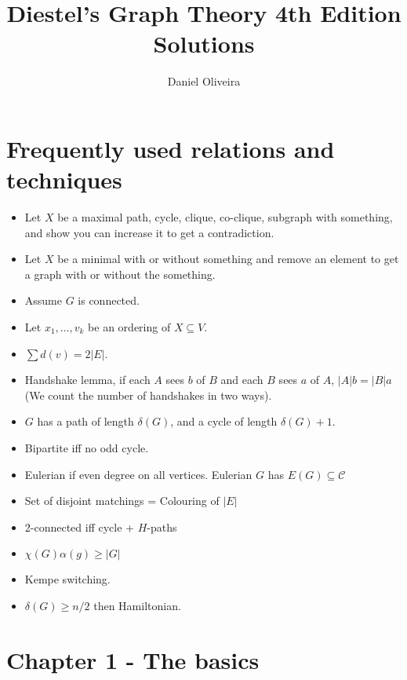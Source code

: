 \documentclass[11pt]{article}
\theoremstyle{plain}
\begin{document}
\title{Diestel's Graph Theory 4th Edition Solutions}
\author{Daniel Oliveira}
\maketitle

\section{Frequently used relations and techniques}

\begin{itemize}

\item Let $X$ be a maximal path, cycle, clique, co-clique, subgraph with something, and show you can increase it to get a contradiction.
\item Let $X$ be a minimal with or without something and remove an element to get a graph with or without the something.
\item Assume $G$ is connected.
\item Let $x_1,\ldots,v_k$ be an ordering of $X\subseteq V$.

\item $\sum d(v) = 2|E|$.
\item Handshake lemma, if each $A$ sees $b$ of $B$ and each $B$ sees $a$ of $A$, $|A|b = |B|a$ (We count the number of handshakes in two ways).
\item $G$ has a path of length $\delta(G)$, and a cycle of length $\delta(G)+1$.
\item Bipartite iff no odd cycle.
\item Eulerian if even degree on all vertices. Eulerian $G$ has $E(G) \subseteq \mathcal{C}$

\item Set of disjoint matchings = Colouring of $|E|$

\item 2-connected iff cycle + $H$-paths

\item $\chi(G)\alpha(g) \geq |G|$
\item Kempe switching.


\item $\delta(G) \geq n/2$ then Hamiltonian.


\end{itemize}

\section{Chapter 1 - The basics}
\end{document}
